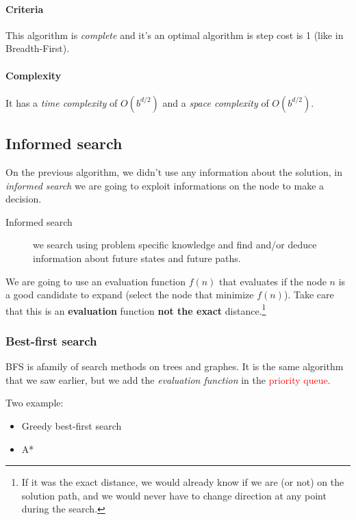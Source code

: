 \paragraph{Criteria}  This algorithm  is \textit{complete}  and it's  an
optimal algorithm is step cost is 1 (like in Breadth-First).

\paragraph{Complexity} It has a \textit{time complexity} of $O(b^{d/2})$
and a \textit{space complexity} of $O(b^{d/2})$.




\subsection{Informed search}

On  the  previous  algorithm,  we   didn't  use  any  information  about
the  solution,  in \textit{informed  search}  we  are going  to  exploit
informations on the node to make a decision.

\begin{description}
\item[Informed search] we search using problem specific knowledge and find and/or deduce information about future states and future paths.
\end{description}

We are going to use an evaluation function $f(n)$ that evaluates if the node $n$ is a good candidate to expand (select the node that minimize $f(n)$). Take care that this is an \textbf{evaluation} function \textbf{not the exact} distance.\footnote{If it was the exact distance, we would already know if we are (or not) on the solution path, and we would never have to change direction at any point during the search.}

\subsubsection{Best-first search}

BFS is afamily of search methods on trees and graphes. It is the same algorithm that we saw earlier, but we add the \textit{evaluation function} in the \textcolor{red}{priority queue}.

Two example:
\begin{itemize}
\item Greedy best-first search
\item A*
\end{itemize}

